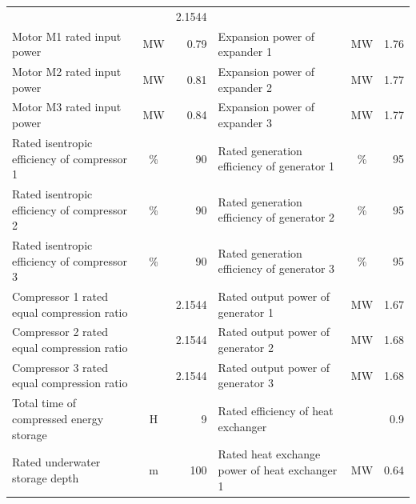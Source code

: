 \documentclass[journal,onecolumn]{IEEEtran}
\begin{document}
\begin{table}[h]
{\begin{tabular}{l|c|r|l|c|r}
		                           &                         & 2.1544 \\
		Motor M1 rated input power             & MW                      & 0.79                        &Expansion power of expander 1                & MW                      & 1.76 \\
		Motor M2 rated input power             & MW                      & 0.81                        &Expansion power of expander 2                & MW                      & 1.77\\
		Motor M3 rated input power             & MW                      & 0.84                        &Expansion power of expander 3                & MW                      & 1.77\\
		Rated isentropic efficiency of compressor 1              & \%                      & 90                          &Rated generation efficiency of generator 1              & \%                      & 95\\
		Rated isentropic efficiency of compressor 2              & \%                      & 90                         &Rated generation efficiency of generator 2              & \%                      & 95\\
		Rated isentropic efficiency of compressor 3              & \%                      & 90                          &Rated generation efficiency of generator 3              & \%                      & 95\\
		Compressor 1 rated equal compression ratio              &                         & 2.1544                     &Rated output power of generator 1              & MW                      & 1.67 \\
		Compressor 2 rated equal compression ratio             &                         & 2.1544                      &Rated output power of generator 2              & MW                      & 1.68\\
		Compressor 3 rated equal compression ratio              &                         & 2.1544                      &Rated output power of generator 3              & MW                      & 1.68\\
		Total time of compressed energy storage                 & H                       & 9                         &Rated efficiency of heat exchanger                &                         & 0.9  \\
		Rated underwater storage depth                & m                       & 100                        &Rated heat exchange power of heat exchanger 1              & MW                      & 0.64  \\

\end{tabular}}
\end{table}
\end{document}
